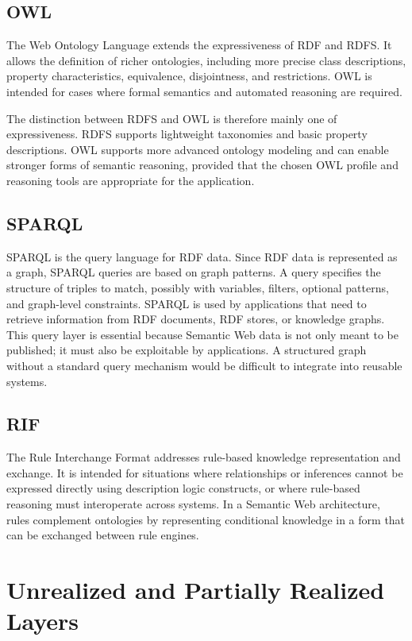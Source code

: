 \documentclass{scrbook}
\begin{document}
	\subsection{OWL}
	
	The Web Ontology Language extends the expressiveness of RDF and RDFS. It allows the definition of richer ontologies, including more precise class descriptions, property characteristics, equivalence, disjointness, and restrictions. OWL is intended for cases where formal semantics and automated reasoning are required.
	
	The distinction between RDFS and OWL is therefore mainly one of expressiveness. RDFS supports lightweight taxonomies and basic property descriptions. OWL supports more advanced ontology modeling and can enable stronger forms of semantic reasoning, provided that the chosen OWL profile and reasoning tools are appropriate for the application.
	
	\subsection{SPARQL}
	
	SPARQL is the query language for RDF data. Since RDF data is represented as a graph, SPARQL queries are based on graph patterns. A query specifies the structure of triples to match, possibly with variables, filters, optional patterns, and graph-level constraints. SPARQL is used by applications that need to retrieve information from RDF documents, RDF stores, or knowledge graphs. This query layer is essential because Semantic Web data is not only meant to be published; it must also be exploitable by applications. A structured graph without a standard query mechanism would be difficult to integrate into reusable systems.
	
	\subsection{RIF}
	
	The Rule Interchange Format addresses rule-based knowledge representation and exchange. It is intended for situations where relationships or inferences cannot be expressed directly using description logic constructs, or where rule-based reasoning must interoperate across systems. In a Semantic Web architecture, rules complement ontologies by representing conditional knowledge in a form that can be exchanged between rule engines.
	
	\section{Unrealized and Partially Realized Layers}
	
\end{document}
